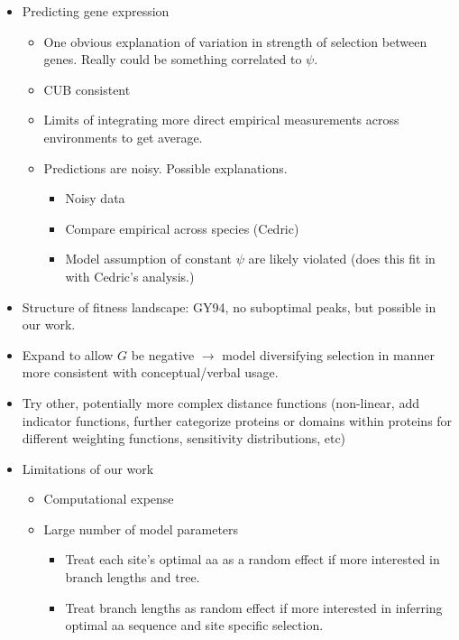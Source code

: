\documentclass[12pt,letterpaper]{article}
\newcommand{\PC}{physico-chemical\xspace}
\begin{document}
\begin{itemize}
\begin{itemize}
\begin{itemize}
    This would allow us to more directly evaluate different hypotheses about whether it's the \PC properties that matter or simply the fact that the aa are different as done in other models.
  \end{itemize}
\item Predicting gene expression
  \begin{itemize}
  \item One obvious explanation of variation in strength of selection between genes.
    Really could be something correlated to $\psi$.
  \item CUB consistent
  \item Limits of integrating more direct empirical measurements across environments to get average.
  \item Predictions are noisy.
    Possible explanations.
    \begin{itemize}
    \item Noisy data
    \item Compare empirical across species (Cedric)      
    \item Model assumption of constant $\psi$ are likely violated (does this fit in with Cedric's analysis.)
    \end{itemize}
  \end{itemize}
\item Structure of fitness landscape: GY94, no suboptimal peaks, but possible in our work.
\item Expand to allow $G$ be negative $\rightarrow$ model diversifying selection in manner more consistent with conceptual/verbal usage.
\item Try other, potentially more complex distance functions (non-linear, add indicator functions, further categorize proteins or domains within proteins for different weighting functions, sensitivity distributions, etc)
\item Limitations of our work
  \begin{itemize}
  \item Computational expense
  \item Large number of model parameters
    \begin{itemize}
    \item Treat each site's optimal aa as a random effect if more interested in branch lengths and tree.
    \item Treat branch lengths as random effect if more interested in inferring optimal aa sequence and site specific selection.
    \end{itemize}

\end{itemize}
\end{itemize}
\end{itemize}
\end{document}
